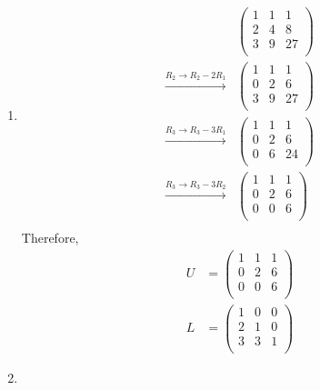\documentclass[fleqn, a4paper, 11pt, oneside]{amsart}
\theoremstyle{definition}
\theoremstyle{theorem}
\begin{document}
\begin{solution}
	\begin{enumerate}[leftmargin=*]
		\item
			\begin{align*}
				&
					\begin{pmatrix}
						1 & 1 & 1  \\
						2 & 4 & 8  \\
						3 & 9 & 27 \\
					\end{pmatrix}\\
				\xrightarrow{R_2 \to R_2 - 2 R_1}&
					\begin{pmatrix}
						1 & 1 & 1  \\
						0 & 2 & 6  \\
						3 & 9 & 27 \\
					\end{pmatrix}\\
				\xrightarrow{R_3 \to R_3 - 3 R_1}&
					\begin{pmatrix}
						1 & 1 & 1  \\
						0 & 2 & 6  \\
						0 & 6 & 24 \\
					\end{pmatrix}\\
				\xrightarrow{R_3 \to R_3 - 3 R_2}&
					\begin{pmatrix}
						1 & 1 & 1 \\
						0 & 2 & 6 \\
						0 & 0 & 6 \\
					\end{pmatrix}\\
			\end{align*}
			Therefore,
			\begin{align*}
				U &=
					\begin{pmatrix}
						1 & 1 & 1 \\
						0 & 2 & 6 \\
						0 & 0 & 6 \\
					\end{pmatrix}\\
				L &=
					\begin{pmatrix}
						1 & 0 & 0 \\
						2 & 1 & 0 \\
						3 & 3 & 1 \\
					\end{pmatrix}
			\end{align*}
		\item

\end{enumerate}
\end{solution}
\end{document}
